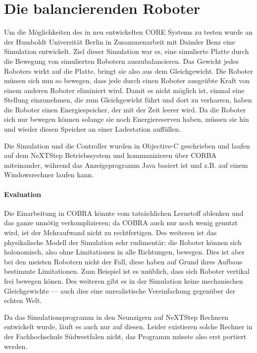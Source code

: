 \clearpage
\section{Die balancierenden Roboter}
Um die M{\"{o}}glichkeiten des in \cite{Werner00} neu entwickelten CORE Systems zu testen wurde an der Humboldt Universit{\"{a}}t Berlin in Zusammenarbeit
mit Daimler Benz eine Simulation entwickelt. Ziel dieser Simulation war es, eine simulierte Platte durch die Bewegung von simulierten
Robotern auszubalancieren. Das Gewicht jedes Roboters wirkt auf die Platte, bringt sie also aus dem Gleichgewicht. Die Roboter m{\"{u}}ssen sich nun so
bewegen, dass jede durch einen Roboter ausge{\"{u}}bte Kraft von einem anderen Roboter eliminiert wird. Damit es nicht m{\"{o}}glich ist, einmal eine Stellung einzunehmen,
die zum Gleichgewicht f{\"{u}}hrt und dort zu verharren, haben die Roboter einen Energiespeicher, der mit der Zeit leerer wird. Da die Roboter sich nur bewegen k{\"{o}}nnen
solange sie noch Energiereserven haben, m{\"{u}}ssen sie hin und wieder diesen Speicher an einer Ladestation auff{\"{u}}llen.

Die Simulation und die Controller wurden in Objective-C geschrieben und laufen auf dem NeXTStep Betriebssystem und kommunizieren {\"{u}}ber CORBA miteinander\cite{predictablecorba},
w{\"{a}}hrend das Anzeigeprogramm Java basiert ist und z.B. auf einem Windowsrechner laufen kann.

\paragraph{Evaluation} Die Einarbeitung in COBRA k{\"{o}}nnte vom tats{\"{a}}chlichen Lernstoff ablenken und das ganze unn{\"{o}}tig verkomplizieren; da COBRA auch nur noch
wenig genutzt wird, ist der Mehraufwand nicht zu rechtfertigen. Des weiteren ist das physikalische Modell der Simulation sehr rudiment{\"{a}}r:
die Roboter k{\"{o}}nnen sich holonomisch, also ohne Limitationen in alle Richtungen, bewegen. Dies ist aber bei den meisten Robotern nicht
der Fall, diese haben auf Grund ihres Aufbaus bestimmte Limitationen. Zum Beispiel ist es un{\"{u}}blich, dass sich Roboter vertikal frei bewegen k{\"{o}}nen. Des weiteren
gibt es in der Simulation keine mechanischen Gleichgewichte --- auch dies eine unrealistische Vereinfachung gegen{\"{u}}ber der echten Welt.

Da das Simulationsprogramm in den Neunzigern auf NeXTStep Rechnern entwickelt wurde, l{\"{a}}uft es auch nur auf diesen. Leider existieren solche Rechner in der Fachhochschule
S{\"{u}}dwestfalen nicht, das Programm m{\"{u}}sste also erst portiert werden.

